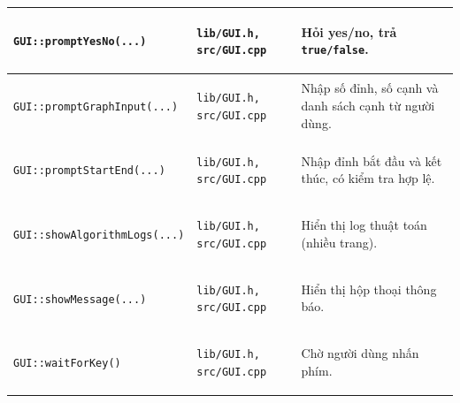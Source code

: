 \documentclass[14pt,a4paper]{report}
\begin{document}
\begin{longtable}{|>{\bfseries\raggedright\arraybackslash}p{}|
                   >{\bfseries\raggedright\arraybackslash}p{2.8cm}|
                   >{\raggedright\arraybackslash}p{}|}
\texttt{GUI::promptYesNo(...)} &
\texttt{lib/GUI.h, src/GUI.cpp} &
Hỏi yes/no, trả \texttt{true/false}.\\ \hline

\texttt{GUI::promptGraphInput(...)} &
\texttt{lib/GUI.h, src/GUI.cpp} &
Nhập số đỉnh, số cạnh và danh sách cạnh từ người dùng.\\ \hline

\texttt{GUI::promptStartEnd(...)} &
\texttt{lib/GUI.h, src/GUI.cpp} &
Nhập đỉnh bắt đầu và kết thúc, có kiểm tra hợp lệ.\\ \hline

\texttt{GUI::showAlgorithmLogs(...)} &
\texttt{lib/GUI.h, src/GUI.cpp} &
Hiển thị log thuật toán (nhiều trang).\\ \hline

\texttt{GUI::showMessage(...)} &
\texttt{lib/GUI.h, src/GUI.cpp} &
Hiển thị hộp thoại thông báo.\\ \hline

\texttt{GUI::waitForKey()} &
\texttt{lib/GUI.h, src/GUI.cpp} &
Chờ người dùng nhấn phím.\\ \hline

\end{longtable}






\renewcommand{\arraystretch}{1.15}
\setlength{\tabcolsep}{6pt}
\end{document}
